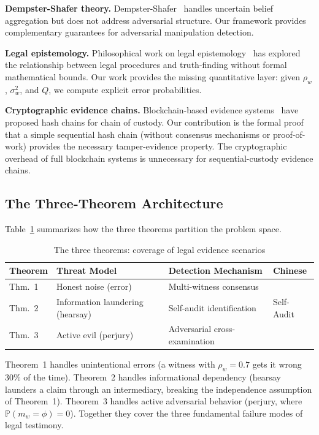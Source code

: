 \documentclass[11pt,a4paper]{article}
\theoremstyle{definition}
\newcommand{\Pbb}{\mathbb{P}}
\newcommand{\fact}{\phi}                        %
\begin{document}
\textbf{Dempster-Shafer theory.} Dempster-Shafer~\cite{Shafer1976} handles uncertain belief aggregation but does not address adversarial structure. Our framework provides complementary guarantees for adversarial manipulation detection.

\textbf{Legal epistemology.} Philosophical work on legal epistemology~\cite{Ho2008, Laudan2006} has explored the relationship between legal procedures and truth-finding without formal mathematical bounds. Our work provides the missing quantitative layer: given $\rho_w$, $\sigma_w^2$, and $Q$, we compute explicit error probabilities.

\textbf{Cryptographic evidence chains.} Blockchain-based evidence systems~\cite{Guo2020, Tian2016} have proposed hash chains for chain of custody. Our contribution is the formal proof that a simple sequential hash chain (without consensus mechanisms or proof-of-work) provides the necessary tamper-evidence property. The cryptographic overhead of full blockchain systems is unnecessary for sequential-custody evidence chains.

\subsection{The Three-Theorem Architecture}

Table~\ref{tab:theorems} summarizes how the three theorems partition the problem space.

\begin{table}[ht]
\centering
\caption{The three theorems: coverage of legal evidence scenarios}
\label{tab:theorems}
\begin{tabular}{@{}llll@{}}
\toprule
\textbf{Theorem} & \textbf{Threat Model} & \textbf{Detection Mechanism} & \textbf{Chinese} \\
\midrule
Thm.~1 & Honest noise (error) & Multi-witness consensus &  \\
Thm.~2 & Information laundering (hearsay) & Self-audit identification & Self-Audit \\
Thm.~3 & Active evil (perjury) & Adversarial cross-examination &  \\
\bottomrule
\end{tabular}
\end{table}

Theorem~1 handles unintentional errors (a witness with $\rho_w = 0.7$ gets it wrong $30\%$ of the time). Theorem~2 handles informational dependency (hearsay launders a claim through an intermediary, breaking the independence assumption of Theorem~1). Theorem~3 handles active adversarial behavior (perjury, where $\Pbb(m_w = \fact) = 0$). Together they cover the three fundamental failure modes of legal testimony.
\end{document}
